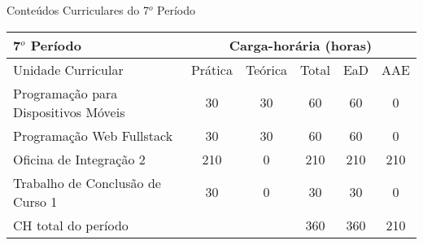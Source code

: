 \begin{quadro}[ht!]
\centering
\caption{Conteúdos Curriculares do 7$^o$ Período}\label{qua:periodo7}
\begin{tabular}{|p{5.0cm}|c|c|c|c|c|}
\hline
\rowcolor{blue1} 7$^o$ Período & \multicolumn{5}{|c|}{\centering Carga-horária (horas)} \\ \hline
\rowcolor{blue1} Unidade Curricular & Prática & Teórica & Total & EaD & AAE \\ \hline
Programação para Dispositivos Móveis & 30 & 30 & 60 & 60	&	0 \\	\hline
Programação Web Fullstack & 30 & 30 & 60 & 60	&	0 \\	\hline
Oficina de Integração 2 & 210 & 0 & 210 & 210	&	210 \\	\hline
Trabalho de Conclusão de Curso 1 & 30 & 0 & 30 & 30	&	0 \\	\hline
CH total do período & \multicolumn{2}{p{3.3cm}|}{\cellcolor{blue1}} & 360 & 360	&	210 \\ \hline
\end{tabular} \end{quadro}
